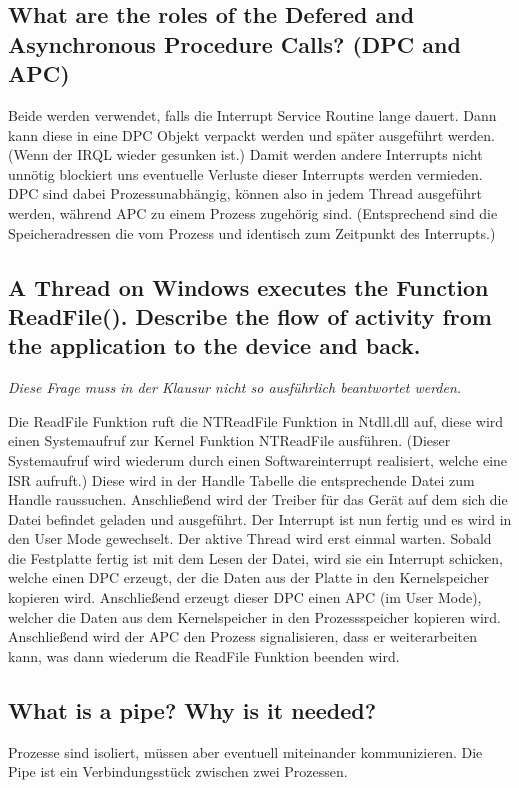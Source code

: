 \subsection{What are the roles of the Defered and Asynchronous Procedure Calls? (DPC and APC)}
Beide werden verwendet, falls die Interrupt Service Routine lange dauert.
Dann kann diese in eine DPC Objekt verpackt werden und später ausgeführt werden.
(Wenn der IRQL wieder gesunken ist.)
Damit werden andere Interrupts nicht unnötig blockiert uns eventuelle Verluste dieser Interrupts werden vermieden.\\
DPC sind dabei Prozessunabhängig, können also in jedem Thread ausgeführt werden, während APC zu einem Prozess zugehörig sind.
(Entsprechend sind die Speicheradressen die vom Prozess und identisch zum Zeitpunkt des Interrupts.)

\subsection{A Thread on Windows executes the Function ReadFile(). Describe the flow of activity from the application to the device and back.}
\textit{Diese Frage muss in der Klausur nicht so ausführlich beantwortet werden.}

Die ReadFile Funktion ruft die NTReadFile Funktion in Ntdll.dll auf, diese wird einen Systemaufruf zur Kernel Funktion NTReadFile ausführen.
(Dieser Systemaufruf wird wiederum durch einen Softwareinterrupt realisiert, welche eine ISR aufruft.)
Diese wird in der Handle Tabelle die entsprechende Datei zum Handle raussuchen.
Anschließend wird der Treiber für das Gerät auf dem sich die Datei befindet geladen und ausgeführt.
Der Interrupt ist nun fertig und es wird in den User Mode gewechselt.
Der aktive Thread wird erst einmal warten.
Sobald die Festplatte fertig ist mit dem Lesen der Datei, wird sie ein Interrupt schicken, welche einen DPC erzeugt, der die Daten aus der Platte in den Kernelspeicher kopieren wird.
Anschließend erzeugt dieser DPC einen APC (im User Mode), welcher die Daten aus dem Kernelspeicher in den Prozessspeicher kopieren wird.
Anschließend wird der APC den Prozess signalisieren, dass er weiterarbeiten kann, was dann wiederum die ReadFile Funktion beenden wird.

\subsection{\important What is a pipe? Why is it needed?}
Prozesse sind isoliert, müssen aber eventuell miteinander kommunizieren.
Die Pipe ist ein Verbindungsstück zwischen zwei Prozessen.


